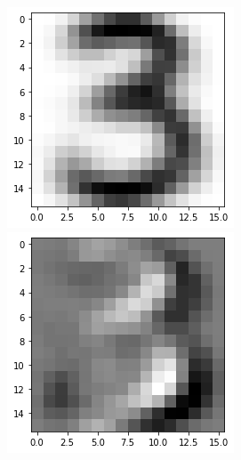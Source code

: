 \documentclass[a4paper,10pt]{report}
\begin{document}
\begin{figure}[!htb]
    \includegraphics[width=\linewidth]{3_feature_1.png}
  \endminipage\hfill
    \includegraphics[width=\linewidth]{3_feature_2.png}

\end{figure}
\end{document}
